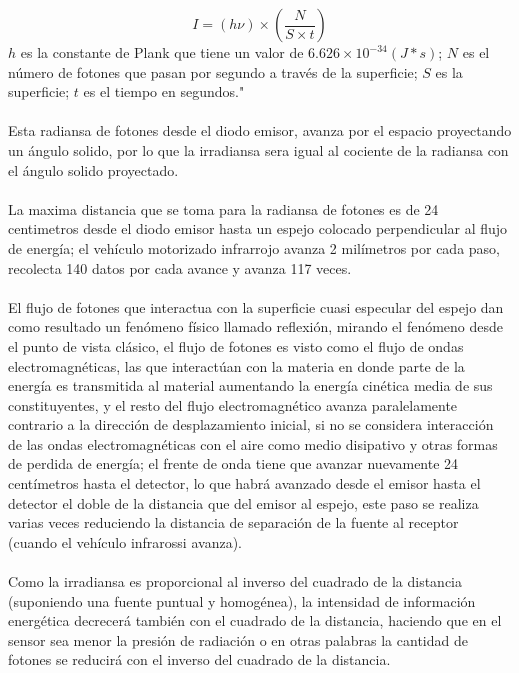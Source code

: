 \documentclass[12]{article}
\begin{document}
\begin{multicols}{2}
\begin{equation}
I = (h\nu)\times \left ( \frac{N}{S\times t } \right)
\end{equation}
$h$ es la constante de Plank que tiene un valor de $6.626 \times 10^{-34} (J * s)$; $N$ es el número de fotones que pasan por segundo a través de la superficie; $S$ es la superficie; $t$ es el tiempo en segundos."\cite{FISICA_MODERNA}\\ \\
Esta radiansa de fotones desde el diodo emisor, avanza por el espacio proyectando un ángulo solido, por lo que la irradiansa  sera igual al cociente de la radiansa con el ángulo solido proyectado.\\\\
La maxima distancia que se toma para la radiansa de fotones es de 24 centimetros desde el diodo emisor hasta un espejo colocado perpendicular al flujo de energía; el vehículo motorizado infrarrojo avanza 2 milímetros por cada paso, recolecta 140 datos por cada avance y avanza 117 veces.\\ \\
El flujo de fotones que interactua con la superficie cuasi especular del espejo dan como resultado un fenómeno físico llamado reflexión, mirando el fenómeno desde el punto de vista clásico, el flujo de fotones  es  visto como el flujo de ondas electromagnéticas,   las que interactúan con la materia  en donde parte de la energía es transmitida al material aumentando la energía cinética media de sus constituyentes, y el resto del flujo electromagnético avanza paralelamente contrario a la dirección de desplazamiento inicial, si no se considera interacción de las ondas electromagnéticas con el aire como medio disipativo  y otras formas de perdida de energía; el frente de onda tiene que avanzar nuevamente 24 centímetros hasta el detector, lo que habrá avanzado desde el emisor hasta el detector el doble de la distancia que del emisor al espejo, este paso se realiza varias veces reduciendo la distancia de separación de la fuente al receptor (cuando el vehículo infrarossi avanza).\\\\
Como la irradiansa es proporcional al inverso del cuadrado de la distancia (suponiendo una fuente puntual y homogénea), la intensidad de información energética decrecerá también con el cuadrado de la distancia, haciendo que en el sensor sea menor la presión de radiación o en otras palabras la cantidad de fotones se reducirá con el inverso del cuadrado de la distancia.\\\\

\end{multicols}
\end{document}
